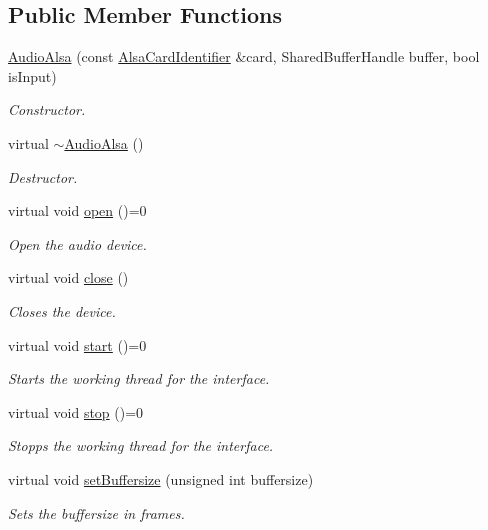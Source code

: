 \subsection*{Public Member Functions}
\begin{DoxyCompactItemize}
\item 
\hyperlink{group__Audio_gaa7d5473de50c4d4a67a6c8c153d88c03}{Audio\-Alsa} (const \hyperlink{classNl_1_1AlsaCardIdentifier}{Alsa\-Card\-Identifier} \&card, Shared\-Buffer\-Handle buffer, bool is\-Input)
\begin{DoxyCompactList}\small\item\em Constructor. \end{DoxyCompactList}\item 
virtual \hyperlink{group__Audio_ga0bdbff0289e06c0fd0ccbe4a570fc286}{$\sim$\-Audio\-Alsa} ()
\begin{DoxyCompactList}\small\item\em Destructor. \end{DoxyCompactList}\item 
virtual void \hyperlink{classNl_1_1AudioAlsa_adada0a143dbd23462e3513a467520b8e}{open} ()=0
\begin{DoxyCompactList}\small\item\em Open the audio device. \end{DoxyCompactList}\item 
virtual void \hyperlink{group__Audio_ga99c454b8bb141a18f0ec39955550ca1e}{close} ()
\begin{DoxyCompactList}\small\item\em Closes the device. \end{DoxyCompactList}\item 
virtual void \hyperlink{classNl_1_1AudioAlsa_a0c5d5f446b903fb48936c2ebb06b42b9}{start} ()=0
\begin{DoxyCompactList}\small\item\em Starts the working thread for the interface. \end{DoxyCompactList}\item 
virtual void \hyperlink{classNl_1_1AudioAlsa_a0c02717d31e7e1226dc619b149b631d0}{stop} ()=0
\begin{DoxyCompactList}\small\item\em Stopps the working thread for the interface. \end{DoxyCompactList}\item 
virtual void \hyperlink{classNl_1_1AudioAlsa_aedd7eae90e53aa2fcd3dede15276a7b6}{set\-Buffersize} (unsigned int buffersize)
\begin{DoxyCompactList}\small\item\em Sets the buffersize in frames. \end{DoxyCompactList}\item 

\end{DoxyCompactItemize}
